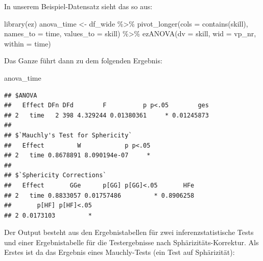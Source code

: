 \documentclass[
]{book}
\newenvironment{Shaded}{\begin{snugshade}}{\end{snugshade}}
\newcommand{\AttributeTok}[1]{\textcolor[rgb]{0.77,0.63,0.00}{#1}}
\newcommand{\FunctionTok}[1]{\textcolor[rgb]{0.00,0.00,0.00}{#1}}
\newcommand{\NormalTok}[1]{#1}
\newcommand{\OtherTok}[1]{\textcolor[rgb]{0.56,0.35,0.01}{#1}}
\newcommand{\SpecialCharTok}[1]{\textcolor[rgb]{0.00,0.00,0.00}{#1}}
\newcommand{\StringTok}[1]{\textcolor[rgb]{0.31,0.60,0.02}{#1}}
\begin{document}
In unserem Beispiel-Datensatz sieht das so aus:

\begin{Shaded}
\begin{Highlighting}[]
\FunctionTok{library}\NormalTok{(ez)}
\NormalTok{anova\_time }\OtherTok{\textless{}{-}} 
\NormalTok{  df\_wide }\SpecialCharTok{\%\textgreater{}\%} 
  \FunctionTok{pivot\_longer}\NormalTok{(}\AttributeTok{cols =} \FunctionTok{contains}\NormalTok{(}\StringTok{\textquotesingle{}skill\textquotesingle{}}\NormalTok{),}
               \AttributeTok{names\_to =} \StringTok{\textquotesingle{}time\textquotesingle{}}\NormalTok{,}
               \AttributeTok{values\_to =} \StringTok{\textquotesingle{}skill\textquotesingle{}}\NormalTok{) }\SpecialCharTok{\%\textgreater{}\%} 
  \FunctionTok{ezANOVA}\NormalTok{(}\AttributeTok{dv =}\NormalTok{ skill,}
          \AttributeTok{wid =}\NormalTok{ vp\_nr,}
          \AttributeTok{within =}\NormalTok{ time)}
\end{Highlighting}
\end{Shaded}

Das Ganze führt dann zu dem folgenden Ergebnis:

\begin{Shaded}
\begin{Highlighting}[]
\NormalTok{anova\_time}
\end{Highlighting}
\end{Shaded}

\begin{verbatim}
## $ANOVA
##   Effect DFn DFd        F          p p<.05        ges
## 2   time   2 398 4.329244 0.01380361     * 0.01245873
## 
## $`Mauchly's Test for Sphericity`
##   Effect         W            p p<.05
## 2   time 0.8678891 8.090194e-07     *
## 
## $`Sphericity Corrections`
##   Effect       GGe      p[GG] p[GG]<.05       HFe
## 2   time 0.8833057 0.01757486         * 0.8906258
##       p[HF] p[HF]<.05
## 2 0.0173103         *
\end{verbatim}

Der Output besteht aus den Ergebnistabellen für zwei inferenzstatistische Tests und einer Ergebnistabelle für die Testergebnisse nach Sphärizitäts-Korrektur.
Als Erstes ist da das Ergebnis eines Mauchly-Tests (ein Test auf Sphärizität):

\begin{Shaded}
\end{Shaded}
\end{document}
